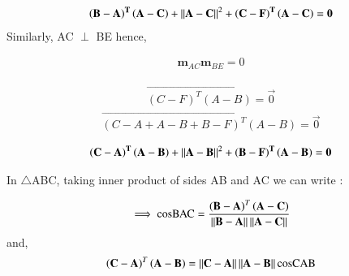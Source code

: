 \documentclass[journal,12pt,twocolumn]{IEEEtran}
\begin{document}
  \begin{align}
 \mathbf{ \left( B -  A \right)^T \left(A - C \right)} + \left\lVert\mathbf {A - C}\right\rVert^{2} + \mathbf{\left(C - F\right)^T \left(A - C \right)} = \mathbf{0} \label{2.5}
  \end{align}
Similarly, AC $\perp$ BE hence,  


 \begin{align}
 \textbf{m}_{AC} \textbf{m}_{BE} = 0
 \end{align}
 
 \begin{align}
 \vec{\left( C - F\right)^T \left(A - B \right)} =\vec{ 0}
 \end{align}
 \begin{align}
 \vec{\left( C -  A + A - B + B - F\right)^T \left(A - B \right)} = \vec{0}
 \end{align}
 
 \begin{align}
 \mathbf{ \left( C-  A \right)^T \left(A - B \right)} + \left\lVert\mathbf {A - B}\right\rVert^{2} + \mathbf{\left(B - F\right)^T \left(A - B \right)} = \mathbf{0} \label{2.9}
 \end{align}
  
  
  \begin{center}
  \end{center}
  
   In $\triangle$ABC, taking inner product of sides  AB and AC we can write :
  
 \begin{align}
\implies \text{cosBAC} = \frac{\left( \mathbf{ B - A} \right)^T  \left( \mathbf{A - C } \right)}{\left\lVert\mathbf{ B - A}\right\rVert \left\lVert\mathbf{A - C}\right\rVert} \label{2.11}
\end{align}  
  and,
   \begin{align}
  \left( \mathbf{C - A} \right)^T \left( \mathbf{A - B} \right) = \left\lVert\mathbf{C - A}\right\rVert \left\lVert\mathbf{ A - B}\right\rVert \text{cosCAB} \label{2.13}
  \end{align}
  
\end{document}

